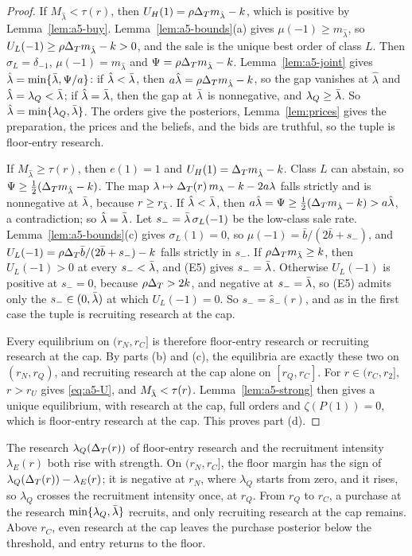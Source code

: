 \begin{proof}
If \(M_{\hat\lambda}<\tau(r)\), then \(U_H(1)=\rho\Delta_T m_{\hat\lambda}-k\), which is positive by
Lemma~\ref{lem:a5-buy}. Lemma~\ref{lem:a5-bounds}(a) gives \(\mu(-1)\ge m_{\hat\lambda}\), so
\(U_L(-1)\ge\rho\Delta_T m_{\hat\lambda}-k>0\), and the sale is the unique best order of class \(L\). Then
\(\sigma_L=\delta_{-1}\), \(\mu(-1)=m_{\hat\lambda}\) and \(\Psi=\rho\Delta_T m_{\hat\lambda}-k\).
Lemma~\ref{lem:a5-joint} gives \(\hat\lambda=\min\{\bar\lambda,\Psi/a\}\): if \(\hat\lambda<\bar\lambda\), then
\(a\hat\lambda=\rho\Delta_T m_{\hat\lambda}-k\), so the gap vanishes at \(\hat\lambda\) and \(\hat\lambda=\lambda_Q<\bar\lambda\);
if \(\hat\lambda=\bar\lambda\), then the gap at \(\bar\lambda\) is nonnegative, and \(\lambda_Q\ge\bar\lambda\). So
\(\hat\lambda=\min\{\lambda_Q,\bar\lambda\}\). The orders give the posteriors, Lemma~\ref{lem:prices} gives the preparation,
the prices and the beliefs, and the bids are truthful, so the tuple is floor-entry research.

If \(M_{\hat\lambda}\ge\tau(r)\), then \(e(1)=1\) and \(U_H(1)=\Delta_T m_{\hat\lambda}-k\). Class \(L\) can abstain, so
\(\Psi\ge\tfrac12(\Delta_T m_{\hat\lambda}-k)\). The map \(\lambda\mapsto\Delta_T(r)\,m_\lambda-k-2a\lambda\) falls strictly and is
nonnegative at \(\bar\lambda\), because \(r\ge r_{\bar\lambda}\). If \(\hat\lambda<\bar\lambda\), then
\(a\hat\lambda=\Psi\ge\tfrac12(\Delta_T m_{\hat\lambda}-k)>a\hat\lambda\), a contradiction; so \(\hat\lambda=\bar\lambda\). Let
\(s_-=\bar\lambda\,\sigma_L(-1)\) be the low-class sale rate. Lemma~\ref{lem:a5-bounds}(c) gives \(\sigma_L(1)=0\), so
\(\mu(-1)=\bar b/(2\bar b+s_-)\), and \(U_L(-1)=\rho\Delta_T\bar b/(2\bar b+s_-)-k\) falls strictly in \(s_-\). If
\(\rho\Delta_T m_{\bar\lambda}\ge k\), then \(U_L(-1)>0\) at every \(s_-<\bar\lambda\), and (E5) gives \(s_-=\bar\lambda\). Otherwise \(U_L(-1)\) is
positive at \(s_-=0\), because \(\rho\Delta_T>2k\), and negative at \(s_-=\bar\lambda\), so (E5) admits only the \(s_-\in(0,\bar\lambda)\)
at which \(U_L(-1)=0\). So \(s_-=\hat s_-(r)\), and as in the first case the tuple is recruiting research at the cap.

Every equilibrium on \((r_N,r_C]\) is therefore floor-entry research or recruiting research at the cap. By parts (b)
and (c), the equilibria are exactly these two on \((r_N,r_Q)\), and recruiting research at the cap alone on
\([r_Q,r_C]\). For \(r\in(r_C,r_2]\), \(r>r_U\) gives \eqref{eq:a5-U}, and \(M_{\bar\lambda}<\tau(r)\).
Lemma~\ref{lem:a5-strong} then gives a unique equilibrium, with research at the cap, full orders and
\(\zeta(P(1))=0\), which is floor-entry research at the cap. This proves part (d).
\end{proof}

The research \(\lambda_Q(\Delta_T(r))\) of floor-entry research and the recruitment intensity \(\lambda_E(r)\) both rise
with strength. On \((r_N,r_C]\), the floor margin has the sign of \(\lambda_Q(\Delta_T(r))-\lambda_E(r)\); it is negative at
\(r_N\), where \(\lambda_Q\) starts from zero, and it rises, so \(\lambda_Q\) crosses the recruitment intensity once, at
\(r_Q\). From \(r_Q\) to \(r_C\), a purchase at the research \(\min\{\lambda_Q,\bar\lambda\}\) recruits, and only recruiting
research at the cap remains. Above \(r_C\), even research at the cap leaves the purchase posterior below the
threshold, and entry returns to the floor.

